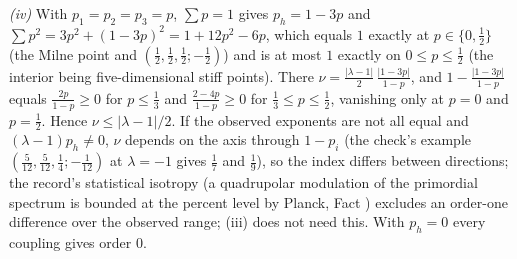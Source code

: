 \emph{(iv)} With $p_{1} = p_{2} = p_{3} = p$, $\sum p = 1$ gives $p_{h} = 1 - 3p$ and $\sum p^{2} = 3p^{2} + (1 - 3p)^{2} = 1 + 12p^{2} - 6p$, which equals $1$ exactly at $p \in \{0, \tfrac12\}$ (the Milne point and $(\tfrac12, \tfrac12, \tfrac12; -\tfrac12)$) and is at most $1$ exactly on $0 \le p \le \tfrac12$ (the interior being five-dimensional stiff points). There $\nu = \tfrac{|\lambda - 1|}{2}\,\tfrac{|1 - 3p|}{1 - p}$, and $1 - \tfrac{|1 - 3p|}{1 - p}$ equals $\tfrac{2p}{1 - p} \ge 0$ for $p \le \tfrac13$ and $\tfrac{2 - 4p}{1 - p} \ge 0$ for $\tfrac13 \le p \le \tfrac12$, vanishing only at $p = 0$ and $p = \tfrac12$. Hence $\nu \le |\lambda - 1|/2$. If the observed exponents are not all equal and $(\lambda - 1)p_{h} \ne 0$, $\nu$ depends on the axis through $1 - p_{i}$ (the check's example $(\tfrac{5}{12}, \tfrac{5}{12}, \tfrac14; -\tfrac{1}{12})$ at $\lambda = -1$ gives $\tfrac17$ and $\tfrac19$), so the index differs between directions; the record's statistical isotropy (a quadrupolar modulation of the primordial spectrum is bounded at the percent level by Planck, Fact ) excludes an order-one difference over the observed range; (iii) does not need this. With $p_{h} = 0$ every coupling gives order $0$.

